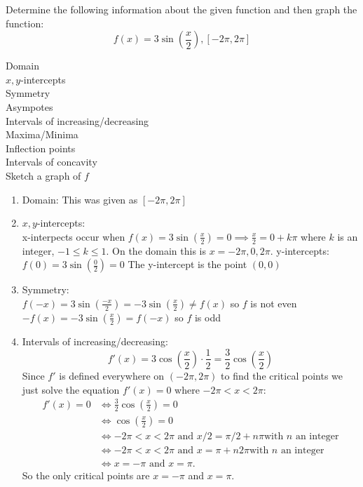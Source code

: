 \documentclass[nooutcomes,handout]{ximera}
\begin{document}
\begin{problem}
  Determine the following information about the given function and then graph the function:
  \[
    f(x) = 3\sin\left(\frac{x}{2}\right), [-2\pi,2\pi]
  \]

 Domain\\
  $x,y$-intercepts\\
  Symmetry\\
  Asympotes\\
  Intervals of increasing/decreasing\\
  Maxima/Minima\\
  Inflection points\\
    Intervals of concavity\\
    Sketch a graph of $f$

\begin{freeResponse}
\begin{enumerate}

\item Domain: This was given as $[-2\pi,2\pi]$

\item $x,y$-intercepts:\\
x-interpects occur when $f(x) = 3\sin\left(\frac{x}{2}\right)=0 \implies \frac{x}{2}=0+k\pi$ where $k$ is an integer, $-1\le k \le 1$.  On the domain this is $x=-2\pi,0,2\pi$.
y-intercepts: $f(0) = 3\sin\left(\frac{0}{2}\right)=0$  The y-intercept is the point $(0,0)$

\item Symmetry:\\
$f(-x)=3\sin\left(\frac{-x}{2}\right)=-3\sin\left(\frac{x}{2}\right) \ne f(x)$ so $f$ is not even
$-f(x)=-3\sin\left(\frac{x}{2}\right)=f(-x)$ so $f$ is odd

\item Intervals of increasing/decreasing:
            \[
              f'(x) = 3 \cos\left(\frac{x}{2}\right) \cdot \frac{1}{2}
              = \frac{3}{2} \cos\left(\frac{x}{2}\right)
            \]
                  Since $f'$ is defined everywhere on $(-2\pi, 2\pi)$ to find
        the critical points we just solve the equation $f'(x) = 0$
        where $-2\pi < x < 2\pi$:
        \begin{align*}
          f'(x) = 0 &\iff \frac{3}{2} \cos\left(\frac{x}{2}\right) = 0
          \\
           &\iff \cos\left(\frac{x}{2}\right) = 0 \\
          &\iff \mbox{$-2\pi < x < 2\pi$ and $x/2 = \pi/2 + n\pi$
            with $n$ an integer}\\
          &\iff \mbox{$-2\pi < x < 2\pi$ and $x = \pi + n2\pi$
            with $n$ an integer}\\
          &\iff \mbox{$x = -\pi$ and $x = \pi$.}
        \end{align*}
        So the only critical points are $x = -\pi$ and $x = \pi$.\\
        

\end{enumerate}
\end{freeResponse}
\end{problem}
\end{document}
